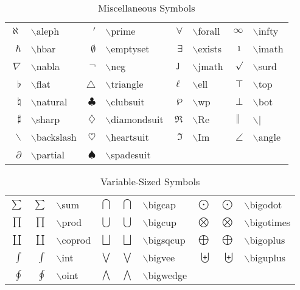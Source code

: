 \begin{table}
\centering
\caption{Miscellaneous Symbols}
\vspace{\baselineskip}
\tablerule
\begin{tabular}{rlrlrlrl}
$\aleph$&$\backslash$aleph&
$\prime$&$\backslash$prime&
$\forall$&$\backslash$forall&
$\infty$&$\backslash$infty\\
$\hbar$&$\backslash$hbar&
$\emptyset$&$\backslash$emptyset&
$\exists$&$\backslash$exists&
$\imath$&$\backslash$imath\\
$\nabla$&$\backslash$nabla&
$\neg$&$\backslash$neg&
$\jmath$&$\backslash$jmath&
$\surd$&$\backslash$surd\\
$\flat$&$\backslash$flat&
$\triangle$&$\backslash$triangle&
$\ell$&$\backslash$ell&
$\top$&$\backslash$top\\
$\natural$&$\backslash$natural&
$\clubsuit$&$\backslash$clubsuit&
$\wp$&$\backslash$wp&
$\bot$&$\backslash$bot\\
$\sharp$&$\backslash$sharp&
$\diamondsuit$&$\backslash$diamondsuit&
$\Re$&$\backslash$Re&
$\|$&$\backslash$|\\
$\backslash$&$\backslash$backslash&
$\heartsuit$&$\backslash$heartsuit&
$\Im$&$\backslash$Im&
$\angle$&$\backslash$angle\\
$\partial$&$\backslash$partial&
$\spadesuit$&$\backslash$spadesuit\\
\end{tabular}
\tablerule
\end{table}
 
\begin{table}
\centering
\caption{Variable-Sized Symbols}
\vspace{\baselineskip}
\tablerule
\begin{tabular}{rrlrrlrrl}
$\sum$&$\displaystyle\sum$&$\backslash$sum&
$\bigcap$&$\displaystyle\bigcap$&$\backslash$bigcap&
$\bigodot$&$\displaystyle\bigodot$&$\backslash$bigodot\\
$\prod$&$\displaystyle\prod$&$\backslash$prod&
$\bigcup$&$\displaystyle\bigcup$&$\backslash$bigcup&
$\bigotimes$&$\displaystyle\bigotimes$&$\backslash$bigotimes\\
$\coprod$&$\displaystyle\coprod$&$\backslash$coprod&
$\bigsqcup$&$\displaystyle\bigsqcup$&$\backslash$bigsqcup&
$\bigoplus$&$\displaystyle\bigoplus$&$\backslash$bigoplus\\
$\int$&$\displaystyle\int$&$\backslash$int&
$\bigvee$&$\displaystyle\bigvee$&$\backslash$bigvee&
$\biguplus$&$\displaystyle\biguplus$&$\backslash$biguplus\\
$\oint$&$\displaystyle\oint$&$\backslash$oint&
$\bigwedge$&$\displaystyle\bigwedge$&$\backslash$bigwedge&\\
\end{tabular}
\tablerule
\end{table}
 
